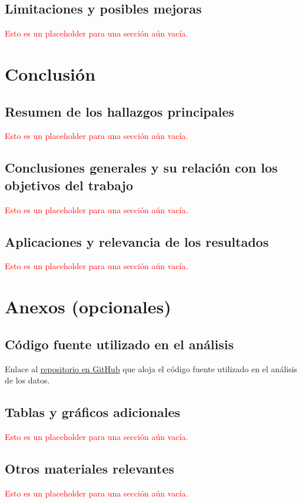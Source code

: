 \documentclass[a4paper]{report}
\begin{document}
\section{Limitaciones y posibles mejoras}
\textcolor{red}{Esto es un placeholder para una sección aún vacía.}




\chapter{Conclusión}

\section{Resumen de los hallazgos principales}
\textcolor{red}{Esto es un placeholder para una sección aún vacía.}



\section{Conclusiones generales y su relación con los objetivos del trabajo}
\textcolor{red}{Esto es un placeholder para una sección aún vacía.}



\section{Aplicaciones y relevancia de los resultados}
\textcolor{red}{Esto es un placeholder para una sección aún vacía.}




\printbibliography[heading=bibintoc] %



\chapter*{Anexos (opcionales)}


\section{Código fuente utilizado en el análisis}
Enlace al \href{https://github.com/bettachini/tallerTesis/tree/main/sismosURL}{repositorio en GitHub} que aloja el código fuente utilizado en el análisis de los datos.



\section{Tablas y gráficos adicionales}
\textcolor{red}{Esto es un placeholder para una sección aún vacía.}


\section{Otros materiales relevantes}
\textcolor{red}{Esto es un placeholder para una sección aún vacía.}
\end{document}
